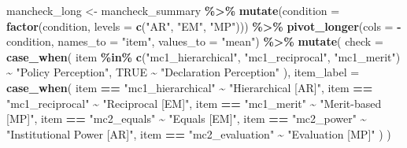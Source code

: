 \documentclass[
]{article}
\newenvironment{Shaded}{\begin{snugshade}}{\end{snugshade}}
\newcommand{\AttributeTok}[1]{\textcolor[rgb]{0.13,0.29,0.53}{#1}}
\newcommand{\ConstantTok}[1]{\textcolor[rgb]{0.56,0.35,0.01}{#1}}
\newcommand{\FunctionTok}[1]{\textcolor[rgb]{0.13,0.29,0.53}{\textbf{#1}}}
\newcommand{\NormalTok}[1]{#1}
\newcommand{\OtherTok}[1]{\textcolor[rgb]{0.56,0.35,0.01}{#1}}
\newcommand{\SpecialCharTok}[1]{\textcolor[rgb]{0.81,0.36,0.00}{\textbf{#1}}}
\newcommand{\StringTok}[1]{\textcolor[rgb]{0.31,0.60,0.02}{#1}}
\begin{document}
\begin{Shaded}
\begin{Highlighting}[]
\NormalTok{mancheck\_long }\OtherTok{\textless{}{-}}\NormalTok{ mancheck\_summary }\SpecialCharTok{\%\textgreater{}\%}
  \FunctionTok{mutate}\NormalTok{(}\AttributeTok{condition =} \FunctionTok{factor}\NormalTok{(condition, }\AttributeTok{levels =} \FunctionTok{c}\NormalTok{(}\StringTok{"AR"}\NormalTok{, }\StringTok{"EM"}\NormalTok{, }\StringTok{"MP"}\NormalTok{))) }\SpecialCharTok{\%\textgreater{}\%}
  \FunctionTok{pivot\_longer}\NormalTok{(}\AttributeTok{cols =} \SpecialCharTok{{-}}\NormalTok{condition,}
               \AttributeTok{names\_to =} \StringTok{"item"}\NormalTok{,}
               \AttributeTok{values\_to =} \StringTok{"mean"}\NormalTok{) }\SpecialCharTok{\%\textgreater{}\%}
  \FunctionTok{mutate}\NormalTok{(}
    \AttributeTok{check =} \FunctionTok{case\_when}\NormalTok{(}
\NormalTok{      item }\SpecialCharTok{\%in\%} \FunctionTok{c}\NormalTok{(}\StringTok{"mc1\_hierarchical"}\NormalTok{, }\StringTok{"mc1\_reciprocal"}\NormalTok{, }\StringTok{"mc1\_merit"}\NormalTok{) }\SpecialCharTok{\textasciitilde{}} \StringTok{"Policy Perception"}\NormalTok{,}
      \ConstantTok{TRUE} \SpecialCharTok{\textasciitilde{}} \StringTok{"Declaration Perception"}
\NormalTok{    ),}
    \AttributeTok{item\_label =} \FunctionTok{case\_when}\NormalTok{(}
\NormalTok{      item }\SpecialCharTok{==} \StringTok{"mc1\_hierarchical"} \SpecialCharTok{\textasciitilde{}} \StringTok{"Hierarchical [AR]"}\NormalTok{,}
\NormalTok{      item }\SpecialCharTok{==} \StringTok{"mc1\_reciprocal"}   \SpecialCharTok{\textasciitilde{}} \StringTok{"Reciprocal [EM]"}\NormalTok{,}
\NormalTok{      item }\SpecialCharTok{==} \StringTok{"mc1\_merit"}        \SpecialCharTok{\textasciitilde{}} \StringTok{"Merit{-}based [MP]"}\NormalTok{,}
\NormalTok{      item }\SpecialCharTok{==} \StringTok{"mc2\_equals"}       \SpecialCharTok{\textasciitilde{}} \StringTok{"Equals [EM]"}\NormalTok{,}
\NormalTok{      item }\SpecialCharTok{==} \StringTok{"mc2\_power"}        \SpecialCharTok{\textasciitilde{}} \StringTok{"Institutional Power [AR]"}\NormalTok{,}
\NormalTok{      item }\SpecialCharTok{==} \StringTok{"mc2\_evaluation"}   \SpecialCharTok{\textasciitilde{}} \StringTok{"Evaluation [MP]"}
\NormalTok{    )}
\NormalTok{  )}


\end{Highlighting}
\end{Shaded}
\end{document}
